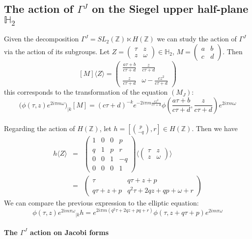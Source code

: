\documentclass[10pt,a4paper]{article}
\begin{document}
\subsection{The action of $\Gamma^J$ on the Siegel upper half-plane $\mathbb{H}_2$}
Given the decomposition $\Gamma	^J = SL_2(\mathbb{Z})\ltimes H(\mathbb{Z})$ we can study the action of $\Gamma^J$ via the action of its subgroups. Let $Z=\left(\begin{array}{cc}\tau&z \\ z & \omega\end{array}\right)\in\mathbb{H}_2$, $M=\left(\begin{array}{cc}a&b \\c & d\end{array}\right)$. Then \[[M]\langle Z\rangle=\left(\begin{array}{cc}
\frac{a\tau+b}{c\tau+d} & \frac{z}{c\tau+d}\\ \frac{z}{c\tau+d}  & \omega-\frac{cz^2}{c\tau+d}\end{array}\right)\]
this corresponds to the transformation of the equation $(M_J)$: \[\big(\phi(\tau,z)e^{2i\pi m\omega}\big)_{|k}[M]=(c\tau+d)^{-k}e^{-2i\pi m\frac{cz^2}{c\tau+d}}\phi\left(\frac{a\tau+b}{c\tau+d},\frac{z}{c\tau+d}\right)e^{2i\pi m\omega}\]
\\
Regarding the action of $H(\mathbb{Z})$, let $h=\left[\binom{p}{-q},r\right]\in H(\mathbb{Z})$. Then we have
\begin{eqnarray*}
h\langle Z\rangle&=&\left(\begin{array}{cccc}
1&0&0&p\\ q&1&p&r\\ 0&0&1& -q \\ 0 &0 &0&1\end{array}\right)\langle\left(\begin{array}{cc}\tau&z \\ z & \omega\end{array}\right)\rangle\\
&=&\left(\begin{array}{cc}\tau&q\tau+z+p \\ q\tau+z+p& q^2\tau+2qz+qp + \omega+r\end{array}\right)
\end{eqnarray*}
We can compare the previous expression to the elliptic equation:
\[\phi(\tau,z){e^{2im\pi\omega}}_{|k}h=e^{2i\pi m(q^2\tau+2qz+pq+r)}\phi(\tau,z+q\tau+p)e^{2im\pi\omega}\]
\\
\textbf{The $\Gamma^J$ action on Jacobi forms}\\
\end{document}

